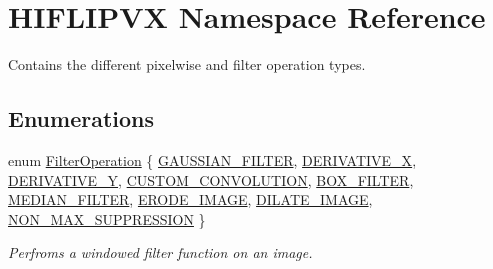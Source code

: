 \hypertarget{namespace_h_i_f_l_i_p_v_x}{}\section{H\+I\+F\+L\+I\+P\+VX Namespace Reference}
\label{namespace_h_i_f_l_i_p_v_x}


Contains the different pixelwise and filter operation types.  


\subsection*{Enumerations}
\begin{DoxyCompactItemize}
\item 
enum \hyperlink{namespace_h_i_f_l_i_p_v_x_a62626da15d80d073221df1590163df57}{Filter\+Operation} \{ \newline
\hyperlink{namespace_h_i_f_l_i_p_v_x_a62626da15d80d073221df1590163df57aeeec0ad0352dfa90243e9c5bdeef915f}{G\+A\+U\+S\+S\+I\+A\+N\+\_\+\+F\+I\+L\+T\+ER}, 
\hyperlink{namespace_h_i_f_l_i_p_v_x_a62626da15d80d073221df1590163df57a25df256c4bcd6cf2c4b38f1810856396}{D\+E\+R\+I\+V\+A\+T\+I\+V\+E\+\_\+X}, 
\hyperlink{namespace_h_i_f_l_i_p_v_x_a62626da15d80d073221df1590163df57ad32cf674d869d4f22318109995845610}{D\+E\+R\+I\+V\+A\+T\+I\+V\+E\+\_\+Y}, 
\hyperlink{namespace_h_i_f_l_i_p_v_x_a62626da15d80d073221df1590163df57a2174023cbc38ac6ce9dd82c5395729ba}{C\+U\+S\+T\+O\+M\+\_\+\+C\+O\+N\+V\+O\+L\+U\+T\+I\+ON}, 
\newline
\hyperlink{namespace_h_i_f_l_i_p_v_x_a62626da15d80d073221df1590163df57a68ce9bfed16f21766c0024de9b371b96}{B\+O\+X\+\_\+\+F\+I\+L\+T\+ER}, 
\hyperlink{namespace_h_i_f_l_i_p_v_x_a62626da15d80d073221df1590163df57a2c3ca2832f6da54982232f75ef7b3cc2}{M\+E\+D\+I\+A\+N\+\_\+\+F\+I\+L\+T\+ER}, 
\hyperlink{namespace_h_i_f_l_i_p_v_x_a62626da15d80d073221df1590163df57abd883d308bb490a8157560b5f5c32bf8}{E\+R\+O\+D\+E\+\_\+\+I\+M\+A\+GE}, 
\hyperlink{namespace_h_i_f_l_i_p_v_x_a62626da15d80d073221df1590163df57aa0e1ea0f6d13a75a304d4569d4486bfa}{D\+I\+L\+A\+T\+E\+\_\+\+I\+M\+A\+GE}, 
\newline
\hyperlink{namespace_h_i_f_l_i_p_v_x_a62626da15d80d073221df1590163df57a0009caddae6040e76893bc5df2399733}{N\+O\+N\+\_\+\+M\+A\+X\+\_\+\+S\+U\+P\+P\+R\+E\+S\+S\+I\+ON}
 \}\begin{DoxyCompactList}\small\item\em Perfroms a windowed filter function on an image. \end{DoxyCompactList}

\end{DoxyCompactItemize}
